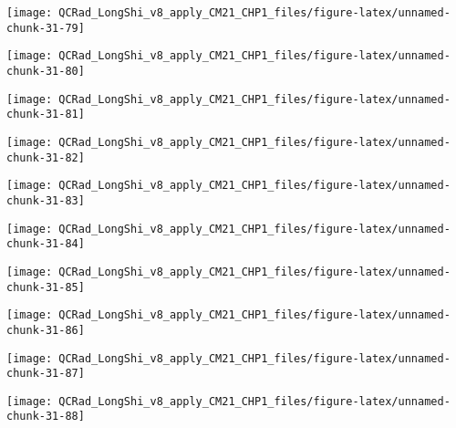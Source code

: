 \documentclass[
  10pt,
  a4paper,oneside]{article}
\begin{document}
\begin{center}\texttt{[image: QCRad\_LongShi\_v8\_apply\_CM21\_CHP1\_files/figure-latex/unnamed-chunk-31-79]} \end{center}

\begin{center}\texttt{[image: QCRad\_LongShi\_v8\_apply\_CM21\_CHP1\_files/figure-latex/unnamed-chunk-31-80]} \end{center}

\begin{center}\texttt{[image: QCRad\_LongShi\_v8\_apply\_CM21\_CHP1\_files/figure-latex/unnamed-chunk-31-81]} \end{center}

\begin{center}\texttt{[image: QCRad\_LongShi\_v8\_apply\_CM21\_CHP1\_files/figure-latex/unnamed-chunk-31-82]} \end{center}

\begin{center}\texttt{[image: QCRad\_LongShi\_v8\_apply\_CM21\_CHP1\_files/figure-latex/unnamed-chunk-31-83]} \end{center}

\begin{center}\texttt{[image: QCRad\_LongShi\_v8\_apply\_CM21\_CHP1\_files/figure-latex/unnamed-chunk-31-84]} \end{center}

\begin{center}\texttt{[image: QCRad\_LongShi\_v8\_apply\_CM21\_CHP1\_files/figure-latex/unnamed-chunk-31-85]} \end{center}

\begin{center}\texttt{[image: QCRad\_LongShi\_v8\_apply\_CM21\_CHP1\_files/figure-latex/unnamed-chunk-31-86]} \end{center}

\begin{center}\texttt{[image: QCRad\_LongShi\_v8\_apply\_CM21\_CHP1\_files/figure-latex/unnamed-chunk-31-87]} \end{center}

\begin{center}\texttt{[image: QCRad\_LongShi\_v8\_apply\_CM21\_CHP1\_files/figure-latex/unnamed-chunk-31-88]} \end{center}
\end{document}
